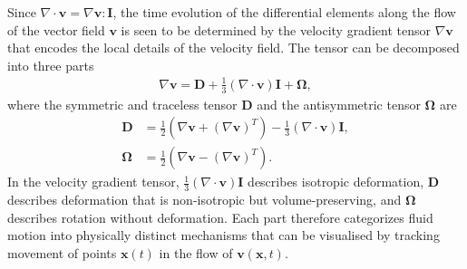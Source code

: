 Since $\nabla\cdot\bm{v}=\nabla\bm{v}:\bm{I}$, the time evolution of the differential elements along the flow of the vector field $\bm{v}$ is seen to be determined by the velocity gradient tensor $\nabla\bm{v}$ that encodes the local details of the velocity field. The tensor can be decomposed into three parts
\begin{align}
    \nabla\bm{v}=\bm{D}+\frac{1}{3}(\nabla\cdot\bm{v})\bm{I}+\bm{\Omega},
\end{align}
where the symmetric and traceless tensor $\bm{D}$ and the antisymmetric tensor $\bm{\Omega}$ are 
\begin{align}
    \bm{D}&=\frac{1}{2}\left(\nabla\bm{v}+(\nabla\bm{v})^T\right)-\frac{1}{3}(\nabla\cdot\bm{v})\bm{I},\\
    \bm{\Omega}&=\frac{1}{2}\left(\nabla\bm{v}-(\nabla\bm{v})^T\right).
\end{align}
In the velocity gradient tensor, $\tfrac{1}{3}(\nabla\cdot\bm{v})\bm{I}$ describes isotropic deformation, $\bm{D}$ describes deformation that is non-isotropic but volume-preserving, and $\bm{\Omega}$ describes rotation without deformation. Each part therefore categorizes fluid motion into physically distinct mechanisms that can be visualised by tracking movement of points $\bm{x}(t)$ in the flow of $\bm{v}(\bm{x},t)$.
